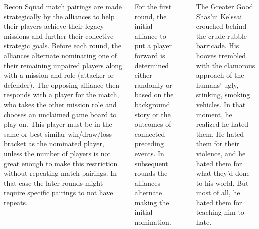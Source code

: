 \begin{columns}

Recon Squad match pairings are made strategically by the alliances to
help their players achieve their legacy missions and further their
collective strategic goals.  Before each round, the alliances
alternate nominating one of their remaining unpaired players along
with a mission and role (attacker or defender).  The opposing alliance
then responds with a player for the match, who takes the other mission
role and chooses an unclaimed game board to play on.  This player must
be in the same or best similar win/draw/loss bracket as the nominated
player, unless the number of players is not great enough to make this
restriction without repeating match pairings.  In that case the later
rounds might require specific pairings to not have repeats.

For the first round, the initial alliance to put a player forward is
determined either randomly or based on the background story or the
outcomes of connected preceding events.  In subsequent rounds the
alliances alternate making the initial nomination.

\columnbreak
\noindent{}\\

\begin{story}{0.75in}{The Greater Good}
  Shas'ui Ke'ssai crouched behind the crude rubble barricade.  His
  hooves trembled with the clamorous approach of the humans' ugly,
  stinking, smoking vehicles.  In that moment, he realized he hated
  them.  He hated them for their violence, and he hated them for what
  they'd done to his world.  But most of all, he hated them for
  teaching him to hate.
\end{story}%
\bigskip


\end{columns}
